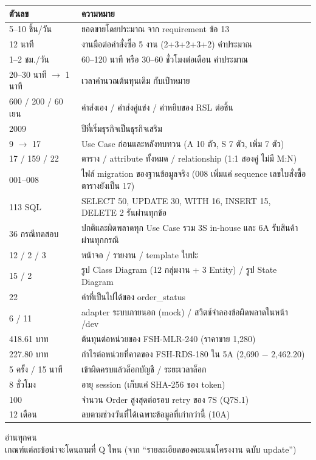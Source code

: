 \documentclass[12pt,a4paper]{article}
\begin{document}
\renewcommand{\arraystretch}{1.15}\small
\begin{tabularx}{\linewidth}{>{\heavy\color{ink}}p{3.4cm} X}
\toprule
ตัวเลข & ความหมาย\\
\midrule
5--10 ชิ้น/วัน & ยอดขายโดยประมาณ จาก requirement ข้อ 13\\
12 นาที & งานมือต่อคำสั่งซื้อ 5 งาน (2+3+2+3+2) ค่าประมาณ\\
1--2 ชม./วัน & 60--120 นาที หรือ 30--60 ชั่วโมงต่อเดือน ค่าประมาณ\\
20--30 นาที $\rightarrow$ 1 นาที & เวลาคำนวณต้นทุนเดิม กับเป้าหมาย\\
600 / 200 / 60 เยน & ค่าส่งเอง / ค่าส่งคู่แข่ง / ค่าหยิบของ RSL ต่อชิ้น\\
2009 & ปีที่เริ่มธุรกิจเป็นธุรกิจเสริม\\
9 $\rightarrow$ 17 & Use Case ก่อนและหลังทบทวน (A 10 ตัว, S 7 ตัว, เพิ่ม 7 ตัว)\\
17 / 159 / 22 & ตาราง / attribute ทั้งหมด / relationship (1:1 สองคู่ ไม่มี M:N)\\
001--008 & ไฟล์ migration ของฐานข้อมูลจริง (008 เพิ่มแค่ sequence เลขใบสั่งซื้อ ตารางยังเป็น 17)\\
113 SQL & SELECT 50, UPDATE 30, WITH 16, INSERT 15, DELETE 2 รันผ่านทุกข้อ\\
36 กรณีทดสอบ & ปกติและผิดพลาดทุก Use Case รวม 3S in-house และ 6A รับสินค้า ผ่านทุกกรณี\\
12 / 2 / 3 & หน้าจอ / รายงาน / template ใบปะ\\
15 / 2 & รูป Class Diagram (12 กลุ่มงาน + 3 Entity) / รูป State Diagram\\
22 & ค่าที่เป็นไปได้ของ order\_status\\
6 / 11 & adapter ระบบภายนอก (mock) / สวิตช์จำลองข้อผิดพลาดในหน้า /dev\\
418.61 บาท & ต้นทุนต่อหน่วยของ FSH-MLR-240 (ราคาขาย 1,280)\\
227.80 บาท & กำไรต่อหน่วยที่คาดของ FSH-RDS-180 ใน 5A (2,690 $-$ 2,462.20)\\
5 ครั้ง / 15 นาที & เข้าผิดครบแล้วล็อกบัญชี / ระยะเวลาล็อก\\
8 ชั่วโมง & อายุ session (เก็บแค่ SHA-256 ของ token)\\
100 & จำนวน Order สูงสุดต่อรอบ retry ของ 7S (Q7S.1)\\
12 เดือน & ลบตามช่วงวันที่ได้เฉพาะข้อมูลที่เก่ากว่านี้ (10A)\\
\bottomrule
\end{tabularx}
\normalsize

\clearpage
\begin{tcolorbox}[enhanced,colback=ink,colframe=ink,arc=4pt,left=10pt,right=10pt,top=8pt,bottom=8pt]
  \color{white}{\heavy\huge เกณฑ์ให้คะแนนกับคำถาม}\hfill{\Large อ่านทุกคน}\\[2pt]
  {\large เกณฑ์แต่ละข้อน่าจะโดนถามที่ Q ไหน (จาก ``รายละเอียดของคะแนนโครงงาน ฉบับ update'')}
\end{tcolorbox}
\end{document}
